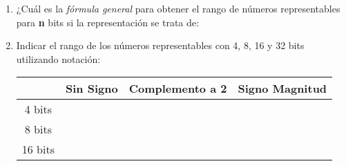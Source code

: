\documentclass[12pt]{article}
\begin{document}
\begin{enumerate}
\begin{enumerate}

    \end{enumerate}

    \item ¿Cuál es la \emph{fórmula general} para obtener el rango de números
    representables para \textbf{n} bits si la representación se trata de:


    \item Indicar el rango de los números representables con 4, 8, 16 y 32
        bits utilizando notación:

        \begin{center}

            \begin{tabular}[t]{|c|c|c|c|}

            \cline{2-4}

            \multicolumn{1}{c|}{}& \textbf{Sin Signo} &
                \textbf{Complemento a 2} & \textbf{Signo Magnitud}\\

            \hline

                4 bits & \hspace{9em}~ &\hspace{9em}~&\hspace{9em}~\\

            \hline

            8 bits&&&\\

            \hline

            16 bits&&&\\


\end{tabular}
\end{center}
\end{enumerate}
\end{document}
